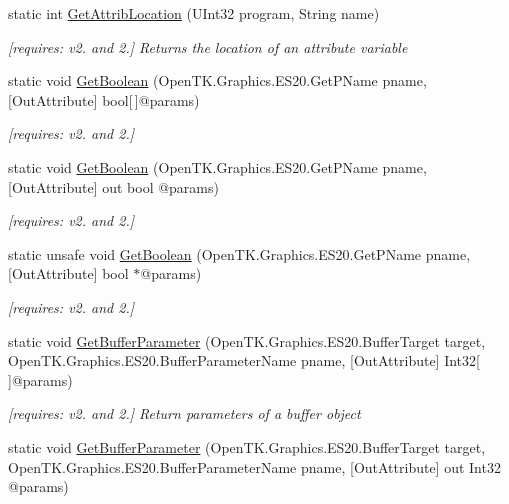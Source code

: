 \begin{DoxyCompactItemize}
static int \hyperlink{class_open_t_k_1_1_graphics_1_1_e_s20_1_1_g_l_a3a92d749c5fb4aa1ef1800e4a65d17b4}{Get\-Attrib\-Location} (U\-Int32 program, String name)
\begin{DoxyCompactList}\small\item\em \mbox{[}requires\-: v2. and 2.\mbox{]} Returns the location of an attribute variable \end{DoxyCompactList}\item 
static void \hyperlink{class_open_t_k_1_1_graphics_1_1_e_s20_1_1_g_l_af3d81adf847643eeb21bde6909129e6a}{Get\-Boolean} (Open\-T\-K.\-Graphics.\-E\-S20.\-Get\-P\-Name pname, \mbox{[}Out\-Attribute\mbox{]} bool\mbox{[}$\,$\mbox{]}@params)
\begin{DoxyCompactList}\small\item\em \mbox{[}requires\-: v2. and 2.\mbox{]}\end{DoxyCompactList}\item 
static void \hyperlink{class_open_t_k_1_1_graphics_1_1_e_s20_1_1_g_l_af0c766333a66870664bafff86c90b6e0}{Get\-Boolean} (Open\-T\-K.\-Graphics.\-E\-S20.\-Get\-P\-Name pname, \mbox{[}Out\-Attribute\mbox{]} out bool @params)
\begin{DoxyCompactList}\small\item\em \mbox{[}requires\-: v2. and 2.\mbox{]}\end{DoxyCompactList}\item 
static unsafe void \hyperlink{class_open_t_k_1_1_graphics_1_1_e_s20_1_1_g_l_a7744eff5cc6bf279bd5265aa216b09b8}{Get\-Boolean} (Open\-T\-K.\-Graphics.\-E\-S20.\-Get\-P\-Name pname, \mbox{[}Out\-Attribute\mbox{]} bool $\ast$@params)
\begin{DoxyCompactList}\small\item\em \mbox{[}requires\-: v2. and 2.\mbox{]}\end{DoxyCompactList}\item 
static void \hyperlink{class_open_t_k_1_1_graphics_1_1_e_s20_1_1_g_l_a951db53411928ffdaaa52755e3ef09da}{Get\-Buffer\-Parameter} (Open\-T\-K.\-Graphics.\-E\-S20.\-Buffer\-Target target, Open\-T\-K.\-Graphics.\-E\-S20.\-Buffer\-Parameter\-Name pname, \mbox{[}Out\-Attribute\mbox{]} Int32\mbox{[}$\,$\mbox{]}@params)
\begin{DoxyCompactList}\small\item\em \mbox{[}requires\-: v2. and 2.\mbox{]} Return parameters of a buffer object \end{DoxyCompactList}\item 
static void \hyperlink{class_open_t_k_1_1_graphics_1_1_e_s20_1_1_g_l_aa8ec3ad395b5f2fd21b2573052784648}{Get\-Buffer\-Parameter} (Open\-T\-K.\-Graphics.\-E\-S20.\-Buffer\-Target target, Open\-T\-K.\-Graphics.\-E\-S20.\-Buffer\-Parameter\-Name pname, \mbox{[}Out\-Attribute\mbox{]} out Int32 @params)

\end{DoxyCompactItemize}

